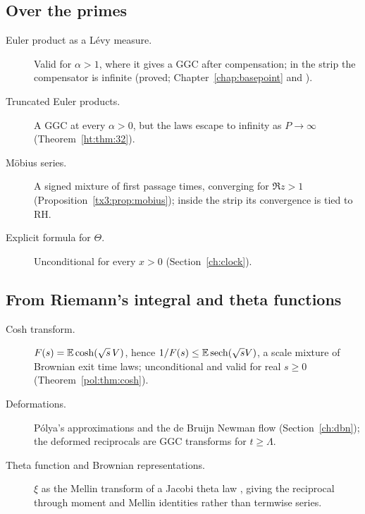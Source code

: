 \subsection*{Over the primes}
\begin{description}
\item[Euler product as a L\'evy measure.] Valid for $\alpha>1$, where it gives a GGC after compensation; in the strip the compensator is infinite (proved; Chapter~\ref{chap:basepoint} and \cite{PolsonEuler26}).
\item[Truncated Euler products.] A GGC at every $\alpha>0$, but the laws escape to infinity as $P\to\infty$ (Theorem~\ref{ht:thm:32}).
\item[M\"obius series.] A signed mixture of first passage times, converging for $\Re z>1$ (Proposition~\ref{tx3:prop:mobius}); inside the strip its convergence is tied to RH.
\item[Explicit formula for $\Theta$.] Unconditional for every $x>0$ (Section~\ref{ch:clock}).
\end{description}

\subsection*{From Riemann's integral and theta functions}
\begin{description}
\item[Cosh transform.] $F(s)=\mathbb{E}\cosh(\sqrt s\,V)$, hence $1/F(s)\le\mathbb{E}\,\mathrm{sech}(\sqrt sV)$, a scale mixture of Brownian exit time laws; unconditional and valid for real $s\ge0$ (Theorem~\ref{pol:thm:cosh}).
\item[Deformations.] P\'olya's approximations and the de Bruijn Newman flow (Section~\ref{ch:dbn}); the deformed reciprocals are GGC transforms for $t\ge\Lambda$.
\item[Theta function and Brownian representations.] $\xi$ as the Mellin transform of a Jacobi theta law \cite{BPY01}, giving the reciprocal through moment and Mellin identities rather than termwise series.
\end{description}

